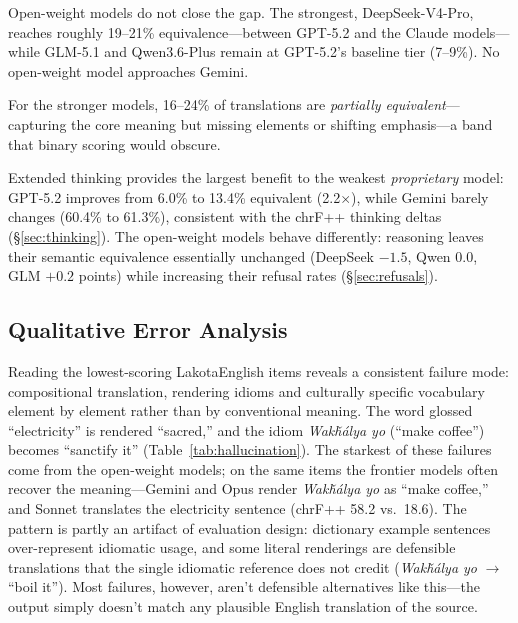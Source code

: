 \documentclass[11pt]{article}
\newcommand{\lak}[1]{\textit{#1}}
\begin{document}
Open-weight models do not close the gap. The strongest, DeepSeek-V4-Pro, reaches roughly 19--21\% equivalence---between GPT-5.2 and the Claude models---while GLM-5.1 and Qwen3.6-Plus remain at GPT-5.2's baseline tier (7--9\%). No open-weight model approaches Gemini.

For the stronger models, 16--24\% of translations are \textit{partially equivalent}---capturing the core meaning but missing elements or shifting emphasis---a band that binary scoring would obscure.

Extended thinking provides the largest benefit to the weakest \textit{proprietary} model: GPT-5.2 improves from 6.0\% to 13.4\% equivalent (2.2$\times$), while Gemini barely changes (60.4\% to 61.3\%), consistent with the chrF++ thinking deltas (\S\ref{sec:thinking}). The open-weight models behave differently: reasoning leaves their semantic equivalence essentially unchanged (DeepSeek $-1.5$, Qwen $0.0$, GLM $+0.2$ points) while increasing their refusal rates (\S\ref{sec:refusals}).

\subsection{Qualitative Error Analysis}
\label{sec:qualitative}

Reading the lowest-scoring Lakota\textrightarrow English items reveals a consistent failure mode: compositional translation, rendering idioms and culturally specific vocabulary element by element rather than by conventional meaning. The word glossed ``electricity'' is rendered ``sacred,'' and the idiom \lak{Wakȟálya yo} (``make coffee'') becomes ``sanctify it'' (Table~\ref{tab:hallucination}). The starkest of these failures come from the open-weight models; on the same items the frontier models often recover the meaning---Gemini and Opus render \lak{Wakȟálya yo} as ``make coffee,'' and Sonnet translates the electricity sentence (chrF++ 58.2 vs.\ 18.6). The pattern is partly an artifact of evaluation design: dictionary example sentences over-represent idiomatic usage, and some literal renderings are defensible translations that the single idiomatic reference does not credit (\lak{Wakȟálya yo} $\rightarrow$ ``boil it''). Most failures, however, aren't defensible alternatives like this---the output simply doesn't match any plausible English translation of the source.
\end{document}
